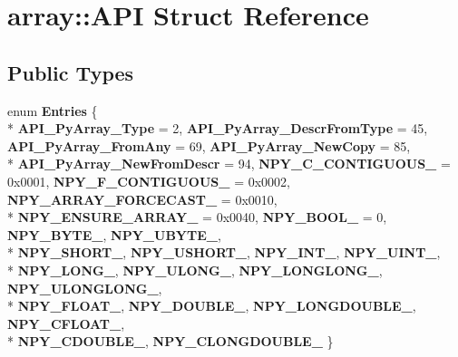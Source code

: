\hypertarget{structarray_1_1_a_p_i}{}\section{array\+:\+:A\+PI Struct Reference}
\label{structarray_1_1_a_p_i}
\subsection*{Public Types}
\begin{DoxyCompactItemize}
\item 
enum {\bfseries Entries} \{ \\*
{\bfseries A\+P\+I\+\_\+\+Py\+Array\+\_\+\+Type} = 2, 
{\bfseries A\+P\+I\+\_\+\+Py\+Array\+\_\+\+Descr\+From\+Type} = 45, 
{\bfseries A\+P\+I\+\_\+\+Py\+Array\+\_\+\+From\+Any} = 69, 
{\bfseries A\+P\+I\+\_\+\+Py\+Array\+\_\+\+New\+Copy} = 85, 
\\*
{\bfseries A\+P\+I\+\_\+\+Py\+Array\+\_\+\+New\+From\+Descr} = 94, 
{\bfseries N\+P\+Y\+\_\+\+C\+\_\+\+C\+O\+N\+T\+I\+G\+U\+O\+U\+S\+\_\+} = 0x0001, 
{\bfseries N\+P\+Y\+\_\+\+F\+\_\+\+C\+O\+N\+T\+I\+G\+U\+O\+U\+S\+\_\+} = 0x0002, 
{\bfseries N\+P\+Y\+\_\+\+A\+R\+R\+A\+Y\+\_\+\+F\+O\+R\+C\+E\+C\+A\+S\+T\+\_\+} = 0x0010, 
\\*
{\bfseries N\+P\+Y\+\_\+\+E\+N\+S\+U\+R\+E\+\_\+\+A\+R\+R\+A\+Y\+\_\+} = 0x0040, 
{\bfseries N\+P\+Y\+\_\+\+B\+O\+O\+L\+\_\+} = 0, 
{\bfseries N\+P\+Y\+\_\+\+B\+Y\+T\+E\+\_\+}, 
{\bfseries N\+P\+Y\+\_\+\+U\+B\+Y\+T\+E\+\_\+}, 
\\*
{\bfseries N\+P\+Y\+\_\+\+S\+H\+O\+R\+T\+\_\+}, 
{\bfseries N\+P\+Y\+\_\+\+U\+S\+H\+O\+R\+T\+\_\+}, 
{\bfseries N\+P\+Y\+\_\+\+I\+N\+T\+\_\+}, 
{\bfseries N\+P\+Y\+\_\+\+U\+I\+N\+T\+\_\+}, 
\\*
{\bfseries N\+P\+Y\+\_\+\+L\+O\+N\+G\+\_\+}, 
{\bfseries N\+P\+Y\+\_\+\+U\+L\+O\+N\+G\+\_\+}, 
{\bfseries N\+P\+Y\+\_\+\+L\+O\+N\+G\+L\+O\+N\+G\+\_\+}, 
{\bfseries N\+P\+Y\+\_\+\+U\+L\+O\+N\+G\+L\+O\+N\+G\+\_\+}, 
\\*
{\bfseries N\+P\+Y\+\_\+\+F\+L\+O\+A\+T\+\_\+}, 
{\bfseries N\+P\+Y\+\_\+\+D\+O\+U\+B\+L\+E\+\_\+}, 
{\bfseries N\+P\+Y\+\_\+\+L\+O\+N\+G\+D\+O\+U\+B\+L\+E\+\_\+}, 
{\bfseries N\+P\+Y\+\_\+\+C\+F\+L\+O\+A\+T\+\_\+}, 
\\*
{\bfseries N\+P\+Y\+\_\+\+C\+D\+O\+U\+B\+L\+E\+\_\+}, 
{\bfseries N\+P\+Y\+\_\+\+C\+L\+O\+N\+G\+D\+O\+U\+B\+L\+E\+\_\+}
 \}\hypertarget{structarray_1_1_a_p_i_a2190a038f73376818262622367a4c6cc}{}\label{structarray_1_1_a_p_i_a2190a038f73376818262622367a4c6cc}

\end{DoxyCompactItemize}
